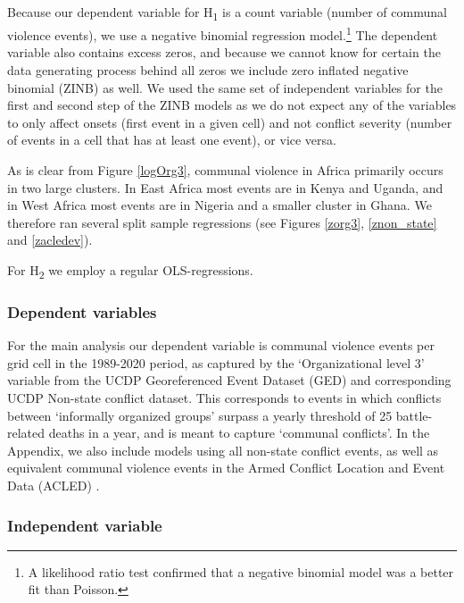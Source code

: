 Because our dependent variable for H\textsubscript{1} is a count variable
(number of communal violence events), we use a negative binomial regression
model.\footnote{A likelihood ratio test confirmed that a negative binomial model
was a better fit than Poisson.} The dependent variable also contains excess
zeros, and because we cannot know for certain the data generating process behind
all zeros we include zero inflated negative binomial (ZINB) as well. We used the
same set of independent variables for the first and second step of the ZINB
models as we do not expect any of the variables to only affect onsets (first
event in a given cell) and not conflict severity (number of events in a cell
that has at least one event), or vice versa.

As is clear from Figure \ref{logOrg3}, communal violence in Africa primarily
occurs in two large clusters. In East Africa most events are in Kenya and
Uganda, and in West Africa most events are in Nigeria and a smaller cluster in
Ghana. We therefore ran several split sample regressions (see Figures \ref{zorg3},
\ref{znon_state} and \ref{zacledev}).


For H\textsubscript{2} we employ a regular OLS-regressions. 

\subsubsection{Dependent variables} \label{Dependent variable}

For the main analysis our dependent variable is communal violence events per
grid cell in the 1989-2020 period, as captured by the `Organizational level 3'
variable from the UCDP Georeferenced Event Dataset (GED) and corresponding UCDP
Non-state conflict dataset. This corresponds to events in which conflicts
between `informally organized groups' surpass a yearly threshold of 25
battle-related deaths in a year, and is meant to capture `communal conflicts'.
In the Appendix, we also include models using all non-state conflict
events, as well as equivalent communal violence events in the Armed Conflict
Location and Event Data (ACLED) \citep{Raleigh_2010}.

\subsubsection{Independent variable} \label{Independent variable}

